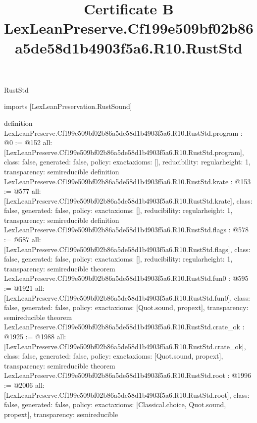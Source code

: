 \begin{lexlean}{RustStd}
\title{Certificate B LexLeanPreserve.Cf199e509bf02b86a5de58d1b4903f5a6.R10.RustStd}
\begin{coremodule}
imports [LexLeanPreservation.RustSound]

definition LexLeanPreserve.Cf199e509bf02b86a5de58d1b4903f5a6.R10.RustStd.program : @0 := @152 {
  all: [LexLeanPreserve.Cf199e509bf02b86a5de58d1b4903f5a6.R10.RustStd.program],
  class: false,
  generated: false,
  policy: exact{axioms: []},
  reducibility: regular{height: 1},
  transparency: semireducible
}
definition LexLeanPreserve.Cf199e509bf02b86a5de58d1b4903f5a6.R10.RustStd.krate : @153 := @577 {
  all: [LexLeanPreserve.Cf199e509bf02b86a5de58d1b4903f5a6.R10.RustStd.krate],
  class: false,
  generated: false,
  policy: exact{axioms: []},
  reducibility: regular{height: 1},
  transparency: semireducible
}
definition LexLeanPreserve.Cf199e509bf02b86a5de58d1b4903f5a6.R10.RustStd.flags : @578 := @587 {
  all: [LexLeanPreserve.Cf199e509bf02b86a5de58d1b4903f5a6.R10.RustStd.flags],
  class: false,
  generated: false,
  policy: exact{axioms: []},
  reducibility: regular{height: 1},
  transparency: semireducible
}
theorem LexLeanPreserve.Cf199e509bf02b86a5de58d1b4903f5a6.R10.RustStd.fun0 : @595 := @1921 {
  all: [LexLeanPreserve.Cf199e509bf02b86a5de58d1b4903f5a6.R10.RustStd.fun0],
  class: false,
  generated: false,
  policy: exact{axioms: [Quot.sound, propext]},
  transparency: semireducible
}
theorem LexLeanPreserve.Cf199e509bf02b86a5de58d1b4903f5a6.R10.RustStd.crate_ok : @1925 := @1988 {
  all: [LexLeanPreserve.Cf199e509bf02b86a5de58d1b4903f5a6.R10.RustStd.crate_ok],
  class: false,
  generated: false,
  policy: exact{axioms: [Quot.sound, propext]},
  transparency: semireducible
}
theorem LexLeanPreserve.Cf199e509bf02b86a5de58d1b4903f5a6.R10.RustStd.root : @1996 := @2006 {
  all: [LexLeanPreserve.Cf199e509bf02b86a5de58d1b4903f5a6.R10.RustStd.root],
  class: false,
  generated: false,
  policy: exact{axioms: [Classical.choice, Quot.sound, propext]},
  transparency: semireducible
}


\end{coremodule}
\end{lexlean}
